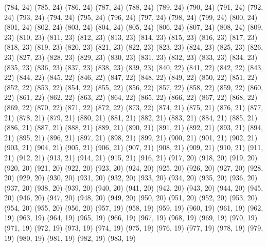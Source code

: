 {   (784, 24)
   (785, 24)
   (786, 24)
   (787, 24)
   (788, 24)
   (789, 24)
   (790, 24)
   (791, 24)
   (792, 24)
   (793, 24)
   (794, 24)
   (795, 24)
   (796, 24)
   (797, 24)
   (798, 24)
   (799, 24)
   (800, 24)
   (801, 24)
   (802, 24)
   (803, 24)
   (804, 24)
   (805, 24)
   (806, 24)
   (807, 24)
   (808, 24)
   (809, 23)
   (810, 23)
   (811, 23)
   (812, 23)
   (813, 23)
   (814, 23)
   (815, 23)
   (816, 23)
   (817, 23)
   (818, 23)
   (819, 23)
   (820, 23)
   (821, 23)
   (822, 23)
   (823, 23)
   (824, 23)
   (825, 23)
   (826, 23)
   (827, 23)
   (828, 23)
   (829, 23)
   (830, 23)
   (831, 23)
   (832, 23)
   (833, 23)
   (834, 23)
   (835, 23)
   (836, 23)
   (837, 23)
   (838, 23)
   (839, 23)
   (840, 22)
   (841, 22)
   (842, 22)
   (843, 22)
   (844, 22)
   (845, 22)
   (846, 22)
   (847, 22)
   (848, 22)
   (849, 22)
   (850, 22)
   (851, 22)
   (852, 22)
   (853, 22)
   (854, 22)
   (855, 22)
   (856, 22)
   (857, 22)
   (858, 22)
   (859, 22)
   (860, 22)
   (861, 22)
   (862, 22)
   (863, 22)
   (864, 22)
   (865, 22)
   (866, 22)
   (867, 22)
   (868, 22)
   (869, 22)
   (870, 22)
   (871, 22)
   (872, 22)
   (873, 22)
   (874, 21)
   (875, 21)
   (876, 21)
   (877, 21)
   (878, 21)
   (879, 21)
   (880, 21)
   (881, 21)
   (882, 21)
   (883, 21)
   (884, 21)
   (885, 21)
   (886, 21)
   (887, 21)
   (888, 21)
   (889, 21)
   (890, 21)
   (891, 21)
   (892, 21)
   (893, 21)
   (894, 21)
   (895, 21)
   (896, 21)
   (897, 21)
   (898, 21)
   (899, 21)
   (900, 21)
   (901, 21)
   (902, 21)
   (903, 21)
   (904, 21)
   (905, 21)
   (906, 21)
   (907, 21)
   (908, 21)
   (909, 21)
   (910, 21)
   (911, 21)
   (912, 21)
   (913, 21)
   (914, 21)
   (915, 21)
   (916, 21)
   (917, 20)
   (918, 20)
   (919, 20)
   (920, 20)
   (921, 20)
   (922, 20)
   (923, 20)
   (924, 20)
   (925, 20)
   (926, 20)
   (927, 20)
   (928, 20)
   (929, 20)
   (930, 20)
   (931, 20)
   (932, 20)
   (933, 20)
   (934, 20)
   (935, 20)
   (936, 20)
   (937, 20)
   (938, 20)
   (939, 20)
   (940, 20)
   (941, 20)
   (942, 20)
   (943, 20)
   (944, 20)
   (945, 20)
   (946, 20)
   (947, 20)
   (948, 20)
   (949, 20)
   (950, 20)
   (951, 20)
   (952, 20)
   (953, 20)
   (954, 20)
   (955, 20)
   (956, 20)
   (957, 19)
   (958, 19)
   (959, 19)
   (960, 19)
   (961, 19)
   (962, 19)
   (963, 19)
   (964, 19)
   (965, 19)
   (966, 19)
   (967, 19)
   (968, 19)
   (969, 19)
   (970, 19)
   (971, 19)
   (972, 19)
   (973, 19)
   (974, 19)
   (975, 19)
   (976, 19)
   (977, 19)
   (978, 19)
   (979, 19)
   (980, 19)
   (981, 19)
   (982, 19)
   (983, 19)
}
